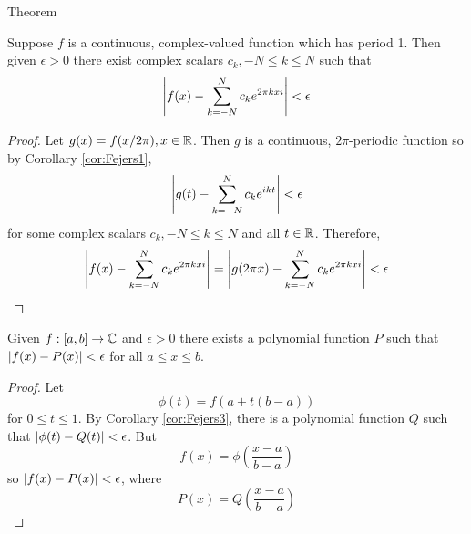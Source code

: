 \begin{section}{\fejers Theorem}
\begin{thrm}\label{cor:Fejers4}
	Suppose $f$ is a continuous, complex-valued function which
	has period 1. Then given $\epsilon > 0$ there exist complex
	scalars $c_k, -N \leq k \leq N$ such that
		\begin{displaymath}
			\modulus{f(x) - \sum_{k=-N}^N c_k e^{2\pi kxi}}
				< \epsilon
		\end{displaymath}
\end{thrm}

\begin{proof}
	Let $g(x) = f(x/{2\pi}), \isreal$. Then $g$ is a continuous, 
	$2\pi$-periodic function so by Corollary \ref{cor:Fejers1},
		\begin{displaymath}
			\modulus{g(t) - \sum_{k=-N}^N c_k e^{ikt}}
				< \epsilon
		\end{displaymath}
	for some complex scalars $c_k, -N \leq k \leq N$ and all $\isreal[t]$.
	Therefore,
		\begin{displaymath}
			\modulus{f(x) - \sum_{k=-N}^N c_k e^{2\pi kxi}} =
				\modulus{g(2\pi x) - \sum_{k=-N}^N c_k e^{2\pi kxi}}
				< \epsilon
		\end{displaymath}
\end{proof}


\begin{thrm}\label{thrm:WeierApprox}
	Given $f:[a,b] \rightarrow \cmplx$ and $\epsilon > 0$
	there exists a polynomial function $P$ such that
	$\modulus{f(x)-P(x)} < \epsilon$ for all $a \leq x \leq b$.
\end{thrm}

\begin{proof}
	Let
		\begin{displaymath}
			\phi(t) = f(a+t(b-a))
		\end{displaymath}
	for $0 \leq t \leq 1$. By Corollary \ref{cor:Fejers3},
	there is a polynomial function $Q$ such that
	$\modulus{\phi(t)-Q(t)} < \epsilon$. But
		\begin{displaymath}
			f(x) = \phi \left( \frac{x-a}{b-a} \right)
		\end{displaymath}
	so $\modulus{f(x)-P(x)} < \epsilon$, where
		\begin{displaymath}
			P(x) = Q \left( \frac{x-a}{b-a} \right)
		\end{displaymath}
\end{proof}


\end{section}
